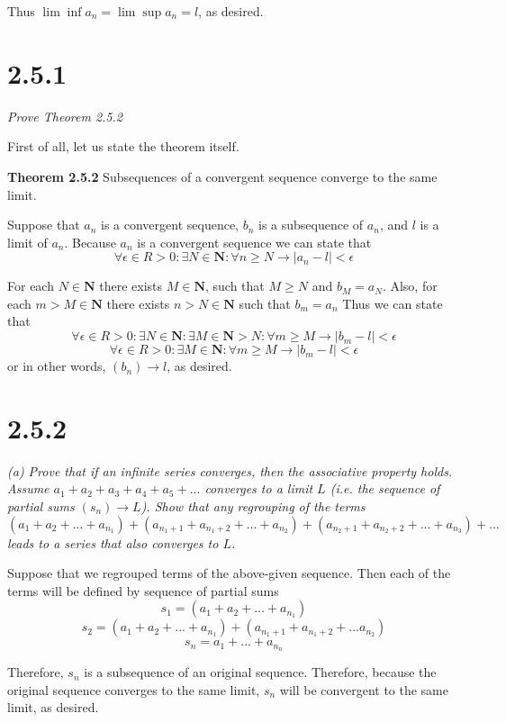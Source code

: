 \documentclass[11pt,oneside,titlepage]{book}
\begin{document}
Thus $\lim \inf a_n = \lim \sup a_n = l$, as desired.

\section*{2.5.1}
\textit{Prove Theorem 2.5.2}

First of all, let us state the theorem itself.

\textbf{Theorem 2.5.2}
Subsequences of a convergent sequence converge to the same limit.

Suppose that $a_n$ is a convergent sequence,  $b_n$ is  a subsequence of
$a_n$, and $l$ is a limit of $a_n$.  Because $a_n$ is a convergent sequence
we can state that 
$$\forall \epsilon \in R > 0: \exists N \in \textbf{N}: \forall n \geq N \to
|a_n - l| < \epsilon$$

For each $N \in \textbf{N}$ there exists $M \in \textbf{N}$, such that
$M \geq N$ and  $b_M = a_N$. Also, for each $m > M \in \textbf{N}$ there exists
$n > N \in \textbf{N}$ such that $b_m = a_n$
Thus we can state that 
$$\forall \epsilon \in R > 0: \exists N \in \textbf{N}: \exists M \in \textbf{N} > N:  \forall m \geq M \to |b_m - l| < \epsilon$$
$$\forall \epsilon \in R > 0:  \exists M \in \textbf{N} :  \forall m \geq M \to |b_m - l| < \epsilon$$
or in other words, $(b_n) \to l$, as desired.

\section*{2.5.2}
\textit{(a) Prove that if an infinite series converges, then the associative
  property holds. Assume $a_1 + a_2 + a_3 + a_4 + a_5 + ...$ converges
  to a limit $L$ (i.e. the sequence of partial sums $(s_n) \to L$). Show that
  any regrouping of the terms}
$$(a_1 + a_2 + ... + a_{n_1}) + (a_{n_1 + 1} + a_{n_1 + 2} + ... + a_{n_2}) +
(a_{n_2 + 1} + a_{n_2 + 2} + ... + a_{n_3}) + ...$$
\textit{leads to a series that also converges to $L$.}

Suppose that we regrouped terms of the above-given sequence. Then each
of the terms will be defined by sequence of partial sums
$$s_1 = (a_1 + a_2 + ... + a_{n_1})$$
$$s_2 = (a_1 + a_2 + ... + a_{n_1}) + (a_{n_1 + 1} + a_{n_1 + 2 } + ... a_{n_2})$$
$$s_n = a_1 + ... + a_{n_n}$$

Therefore, $s_n$ is a subsequence of an original sequence. 
Therefore, because the original sequence converges to the same limit,
$s_n$ will be convergent to the same limit, as desired.
\end{document}
